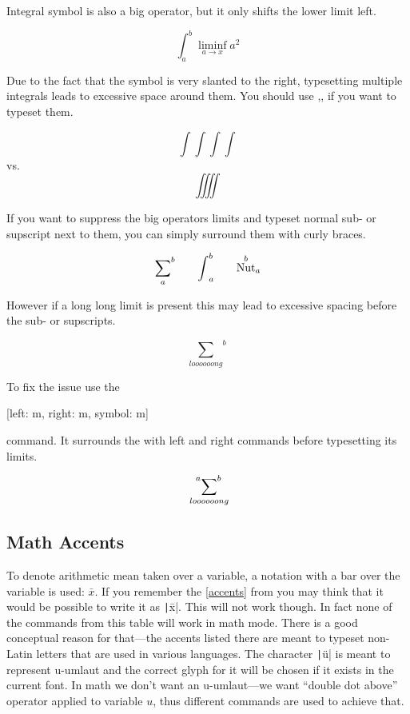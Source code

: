 Integral symbol is also a big operator, but it only shifts the lower limit left.
\begin{example}
\[
  \int_a^b \liminf_{a \to x} a^2
\]
\end{example}
Due to the fact that the symbol is very slanted to the right,
typesetting multiple integrals leads to excessive space around them. You
should use ,, if you want to typeset them.
\begin{example}
\[ \int\int\int\int \]
vs.\ 
\[ \iiiint \]
\end{example}

If you want to suppress the big operators limits and typeset normal sub- or
supscript next to them, you can simply surround them with curly braces.
\begin{example}
\[
  {\sum_{a}}^b
  \qquad%
  {\int}_a^b
  \qquad%
  {\nut^b}_a
\]
\end{example}
However if a long long limit is present this may lead to excessive spacing
before the sub- or supscripts.
\begin{example}
\[ {\sum_{loooooong}}^{b} \]
\end{example}
To fix the issue use the
\begin{lscommand}
  [left: m, right: m, symbol: m]
\end{lscommand}
command. It surrounds the  with left and right commands before
typesetting its limits.
\begin{example}[vertical_mode, examplewidth=0.7\linewidth]
\[ \sideset{^{a}}{^{b}}{\sum}_{loooooong} \]
\end{example}

\subsection{Math Accents}\label{sec:math_accents}

To denote arithmetic mean taken over a variable, a notation with a bar over the
variable is used: \(\bar x\). If you remember the \autoref{accents} from
\autopageref{accents} you may think that it would be possible to write it as
\texttt|\=x|. This will not work though. In fact none of the
commands from this table will work in math mode. There is a good conceptual
reason for that---the accents listed there are meant to typeset non-Latin
letters that are used in various languages. The character
\texttt|\"u| is meant to represent u-umlaut and the correct glyph
for it will be chosen if it exists in the current font. In math we don't want
an u-umlaut---we want \enquote{double dot above} operator applied to variable
\(u\), thus different commands are used to achieve that.


